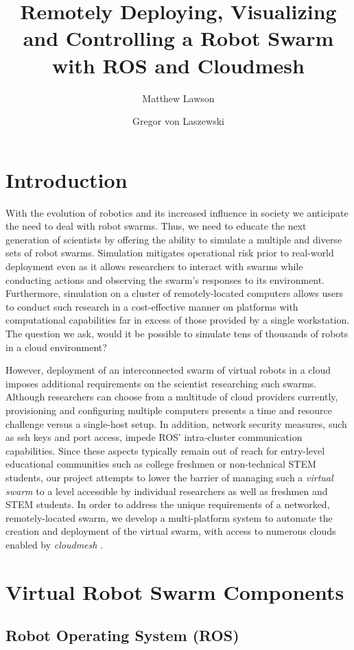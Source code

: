 \documentclass[9pt,twocolumn,twoside]{../../styles/osajnl}
\title{Remotely Deploying, Visualizing and Controlling a Robot Swarm with ROS and Cloudmesh}
\author[1]{Matthew Lawson}
\author[1,*]{Gregor von Laszewski}
\affil[1]{School of Informatics and Computing, Bloomington, IN 47408, U.S.A.}
\affil[*]{Corresponding authors: laszewski@gmail.com}
\begin{document}
\maketitle

\section{Introduction}
With the evolution of robotics and its increased influence in society we anticipate the need to deal with robot swarms. Thus, we need to educate the next generation of scientists by offering the ability to simulate a multiple and diverse sets of robot swarms. Simulation mitigates operational risk prior to real-world deployment even as it allows researchers to interact with swarms while conducting actions and observing the swarm's responses to its environment. Furthermore, simulation on a cluster of remotely-located computers allows users to conduct such research in a cost-effective manner on platforms with computational capabilities far in excess of those provided by a single workstation. The question we ask, would it be possible to simulate tens of thousands of robots in a cloud environment?

However, deployment of an interconnected swarm of virtual robots in a cloud imposes additional requirements on the scientist researching such swarms.  Although researchers can choose from a multitude of cloud providers currently, provisioning and configuring multiple computers presents a time and resource challenge versus a single-host setup.  In addition, network security measures, such as ssh keys and port access, impede ROS' intra-cluster communication capabilities.  Since these aspects typically remain out of reach for entry-level educational communities such as college freshmen or non-technical STEM students, our project attempts to lower the barrier of managing such a {\em virtual swarm} to a level accessible by individual researchers as well as freshmen and STEM students.  In order to address the unique requirements of a networked, remotely-located swarm, we develop a multi-platform system to automate the creation and deployment of the virtual swarm, with access to numerous clouds enabled by \textit{cloudmesh} \cite{??}.

\section{Virtual Robot Swarm Components}

\subsection{Robot Operating System (ROS) \cite{paper2}}
\end{document}
